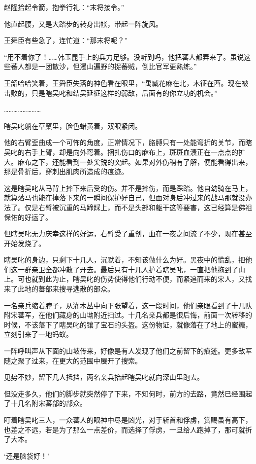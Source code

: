 赵隆拾起令箭，抱拳行礼：“末将接令。”

他直起腰，又是大踏步的转身出帐，带起一阵旋风。

王舜臣有些急了，连忙道：“那末将呢？”

“用不着你了！……韩玉昆手上的兵力足够。没听到吗，他把蕃人都弄来了。虽说这些蕃人都是一团散沙，但漫山遍野的捉蕃贼，倒比官军更熟练。”

王韶哈哈笑着，王舜臣失落的神色看在眼里，“禹臧花麻在北，木征在西。现在被击败的，只是瞎吴叱和结吴延征这样的弱敌，后面有的你立功的机会。”

……………………

瞎吴叱躺在草窠里，脸色蜡黄着，双眼紧闭。

他的右臂歪曲成一个可怖的角度，正常情况下，胳膊只有一处能弯折的关节，而瞎吴叱的右手上臂，却是向外弯着。捆扎伤口的麻布上，斑斑血渍正在一点点的扩大。麻布之下，还能看到一处尖锐的突起。如果对外伤稍有了解，便能看得出来，那是骨折后，穿刺出肌肉所造成的痕迹。

这是瞎吴叱从马背上摔下来后受的伤。并不是摔伤，而是踩踏。他自幼骑在马上，就算落马也能在掉落下来的一瞬间保护好自己，但面对身后冲过来的战马那就没办法了。仅是右臂被沉重的马蹄踩上，而不是头部和躯干这等要害，这已经算是佛祖保佑的好运了。

但瞎吴叱无力庆幸这样的好运，右臂受了重创，血在一夜之间流了不少，现在甚至开始发烧了。

瞎吴叱的身边，只剩下十几人，沉默着，不知该做什么为好。黑夜中的慌乱，把他们这一群亲卫全都冲散了开去。最后只有十几人护着瞎吴叱，一直把他拖到了山上。可也就到此为止，瞎吴叱的伤势使得他们行动不便，而紧追而来的宋人，又找来了此地的蕃部来搜寻逃散的部众。

一名亲兵缩着脖子，从灌木丛中向下张望着，这一段时间，他们亲眼看到了十几队附宋蕃军，在他们藏身的山坳附近扫过。十几名亲兵都是很后悔，前面一次转移的时候，不该落下了瞎吴叱的镶了宝石的头盔。这份物证，就像落在了地上的蜜糖，立刻引来了一地蚂蚁。

一阵呼叫声从下面的山坡传来，好像是有人发现了他们之前留下的痕迹。更多敌军随之聚了过来，在更大的范围中展开了搜索。

见势不妙，留下几人抵挡，两名亲兵抬起瞎吴叱就向深山里跑去。

但没走多久，他们的脚步就突然停了下来，不知何时，前方的去路，竟然已经围起了十几名附宋蕃部的部众。

盯着瞎吴叱三人，一众蕃人的眼神中尽是凶光，对于斩首和俘虏，赏赐虽有高下，也差之不远，若是为了那么一点差价，而选择了俘虏，一旦给人跑掉了，那可就折了大本。

‘还是脑袋好！’


